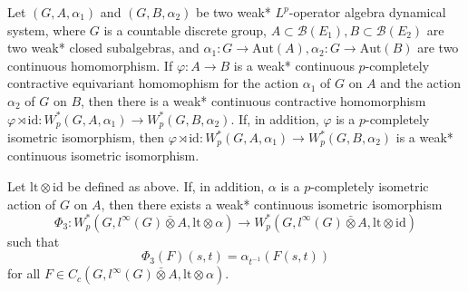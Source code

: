 \documentclass[10pt,a4paper]{amsart}
\begin{document}
\begin{lem}\label{induce}
Let $(G,A,\alpha_1)$ and $(G,B,\alpha_2)$ be two weak* $L^p$-operator algebra dynamical system, where $G$ is a countable discrete group, $A\subset\mathcal{B}(E_1),B\subset\mathcal{B}(E_2)$ are two weak* closed subalgebras, and $\alpha_1:G\rightarrow \mathrm{Aut}(A), \alpha_2:G\rightarrow \mathrm{Aut}(B)$ are two continuous homomorphism. If $\varphi:A\rightarrow B$ is a weak* continuous $p$-completely contractive equivariant homomophism for the action $\alpha_1$ of $G$ on $A$ and the action $\alpha_2$ of $G$ on $B$, then there is a weak* continuous contractive homomorphism $\varphi\rtimes\mathrm{id}:W^*_p(G,A,\alpha_1)\rightarrow W^*_p(G,B,\alpha_2)$. If, in addition, $\varphi$ is a $p$-completely isometric isomorphism, then $\varphi\rtimes\mathrm{id}:W^*_p(G,A,\alpha_1)\rightarrow W^*_p(G,B,\alpha_2)$ is a weak* continuous isometric isomorphism.
\end{lem}

\begin{prop}\label{3}
Let $\mathrm{lt}\otimes\mathrm{id}$ be defined as above. If, in addition, $\alpha$ is a $p$-completely isometric action of $G$ on $A$, then
there exists a weak* continuous isometric isomorphism $$\Phi_3:W^*_p(G,l^\infty(G)\bar{\otimes}A,\mathrm{lt}\otimes\alpha)\rightarrow W^*_p(G,l^\infty(G)\bar{\otimes}A,\mathrm{lt}\otimes\mathrm{id})$$ such that $$\Phi_3(F)(s,t)=\alpha_{t^{-1}}(F(s,t))$$ for all $F\in C_c(G,l^\infty(G)\bar{\otimes}A,\mathrm{lt}\otimes\alpha)$.
\end{prop}
\end{document}
